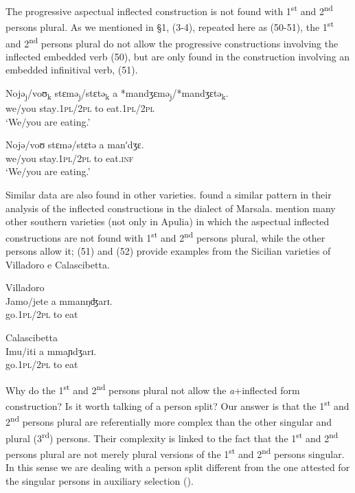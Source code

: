 \documentclass[output=paper]{langsci/langscibook}
\begin{document}
The progressive aspectual inflected construction is not found with 1\textsuperscript{st} and 2\textsuperscript{nd} persons plural. As we mentioned in §1, (3-4), repeated here as (50-51), the 1\textsuperscript{st} and 2\textsuperscript{nd} persons plural do not allow the progressive constructions involving the inflected embedded verb (50), but are only found in the construction involving an embedded infinitival verb, (51). 

\ea%
    \label{ex:lorusso:50}
    \gll Nojə\textsubscript{j}/voʊ\textsubscript{k}   stɛmə\textsubscript{j}/stɛtə\textsubscript{k}   a       *mandʒɛmə\textsubscript{j}/*mandʒɛtə\textsubscript{k}.\\
         we/you  stay\textsc{.1pl/2pl}  to   eat.\textsc{1pl/2pl}\\
    \glt ‘We/you are eating.’
\z


\ea%
    \label{ex:lorusso:51}
    \gll Nojə/voʊ   stɛmə/stɛtə  a   manʹdʒɛ.\\
         we/you  stay.\textsc{1pl/2pl}  to   eat\textsc{.inf}\\
    \glt ‘We/you are eating.’
\z


Similar data are also found in other varieties. \citet{Cardinaletti2003} found a similar pattern in their analysis of the inflected constructions in the dialect of Marsala. \citet{Manzini2005} mention many other southern varieties (not only in Apulia) in which the aspectual inflected constructions are not found with 1\textsuperscript{st} and 2\textsuperscript{nd} persons plural, while the other persons allow it; (51) and (52) provide examples from the Sicilian varieties of Villadoro e Calascibetta.

\ea%
         Villadoro\label{ex:lorusso:52}\\
    \gll Jamo/jete   a   mmanŋʤarɪ.\\
         go.\textsc{1pl/2pl}   to  eat \\
    \z


\ea%
         Calascibetta\label{ex:lorusso:53}\\
    \gll Imu/iti   a  mmaɲdʒarɪ.  \\
         go.\textsc{1pl/2pl} to  eat \\
    \z

Why do the 1\textsuperscript{st} and 2\textsuperscript{nd} persons plural not allow the \textit{a}+inflected form construction? Is it worth talking of a person split? Our answer is that the 1\textsuperscript{st} and 2\textsuperscript{nd} persons plural are referentially more complex than the other singular and plural (3\textsuperscript{rd}) persons. Their complexity is linked to the fact that the 1\textsuperscript{st} and 2\textsuperscript{nd} persons plural are not merely plural versions of the 1\textsuperscript{st} and 2\textsuperscript{nd} persons singular. In this sense we are dealing with a person split different from the one attested for the singular persons in auxiliary selection (\citealt{Manzini2005,Manzini2007,Manzini2011Bio}).
\end{document}
